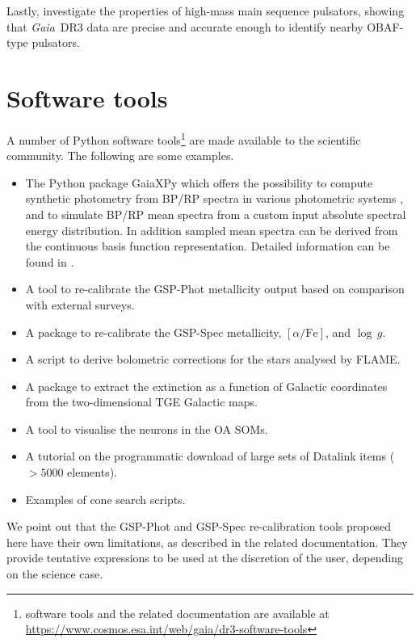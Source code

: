 \documentclass[longauth]{aa}
\providecommand{\loggrav}{\ensuremath{\log\,g}\xspace}
\providecommand{\bprp}{BP/RP\xspace}
\providecommand{\modulename}[1]{#1\xspace}
\providecommand{\gspphot}{\modulename{GSP-Phot}}
\providecommand{\gspspec}{\modulename{GSP-Spec}}
\providecommand\gdrthree{\textit{Gaia}~DR3\xspace}
\begin{document}
Lastly, \citet{DR3-DPACP-79} investigate the properties of high-mass main sequence pulsators, showing that \gdrthree data are precise and accurate enough to identify   nearby OBAF-type pulsators.  


\section{Software tools}\label{ssec:tools}
A number of Python software tools\footnote{software tools and the related documentation are available at {\url{https://www.cosmos.esa.int/web/gaia/dr3-software-tools}}} are made available to the scientific community.  The following are some examples.

\begin{itemize}
    \item The Python package GaiaXPy which offers  the possibility to compute  synthetic photometry from \bprp spectra in various photometric systems \citep[see][and Sect.~\ref{ssec:science}]{DR3-DPACP-93}, and to simulate \bprp mean spectra from a custom input absolute spectral energy distribution. In addition sampled mean spectra can be derived from the continuous basis function representation. Detailed information can be found in  \citet{EDR3-DPACP-118}.
\item A tool to  re-calibrate the \gspphot metallicity output  \citep[see][Appendix E for detail]{DR3-DPACP-157} based on comparison with external surveys.
    \item A package  to re-calibrate the \gspspec metallicity, $[\alpha/\mathrm{Fe}]$, and \loggrav \citep{DR3-DPACP-186}.
    \item  A script to derive bolometric corrections for the stars analysed by FLAME.
    \item A package to extract the extinction as a function of Galactic coordinates from the two-dimensional TGE Galactic maps.
    \item A tool to visualise the neurons in the OA SOMs.
    \item A tutorial on the programmatic download of large sets of Datalink items ($>5000$ elements).
    \item Examples of cone search scripts.
\end{itemize}

 We point out that the  \gspphot and \gspspec re-calibration tools proposed here have their own limitations, as described in the related documentation.  They provide  tentative expressions to be used at the  discretion of the user, depending on the science case.
\end{document}
